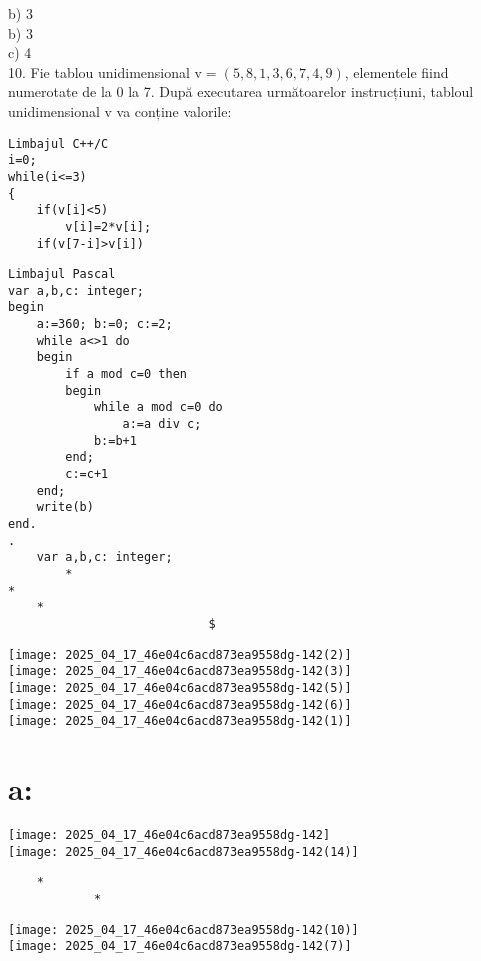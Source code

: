 b) 3\\
b) 3\\
c) 4\\
10. Fie tablou unidimensional $\mathrm{v}=(5,8,1,3,6,7,4,9)$, elementele fiind numerotate de la 0 la 7. După executarea următoarelor instrucțiuni, tabloul unidimensional v va conține valorile:

\begin{verbatim}
Limbajul C++/C
i=0;
while(i<=3)
{
    if(v[i]<5)
        v[i]=2*v[i];
    if(v[7-i]>v[i])
\end{verbatim}

\begin{verbatim}
Limbajul Pascal
var a,b,c: integer;
begin
    a:=360; b:=0; c:=2;
    while a<>1 do
    begin
        if a mod c=0 then
        begin
            while a mod c=0 do
                a:=a div c;
            b:=b+1
        end;
        c:=c+1
    end;
    write(b)
end.
.
    var a,b,c: integer;
        *
*
    *
                            $
\end{verbatim}

$\qquad$\\
\texttt{[image: 2025\_04\_17\_46e04c6acd873ea9558dg-142(2)]}\\
\texttt{[image: 2025\_04\_17\_46e04c6acd873ea9558dg-142(3)]}\\
\texttt{[image: 2025\_04\_17\_46e04c6acd873ea9558dg-142(5)]}\\
\texttt{[image: 2025\_04\_17\_46e04c6acd873ea9558dg-142(6)]}\\
\texttt{[image: 2025\_04\_17\_46e04c6acd873ea9558dg-142(1)]}

\section*{a:}
\texttt{[image: 2025\_04\_17\_46e04c6acd873ea9558dg-142]}\\
\texttt{[image: 2025\_04\_17\_46e04c6acd873ea9558dg-142(14)]}

\begin{verbatim}
    *
            *
\end{verbatim}

\texttt{[image: 2025\_04\_17\_46e04c6acd873ea9558dg-142(10)]}\\
\texttt{[image: 2025\_04\_17\_46e04c6acd873ea9558dg-142(7)]}

